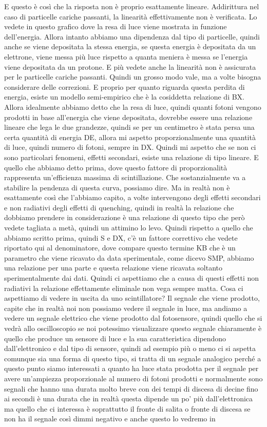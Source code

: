{E questo è così che la risposta non è proprio esattamente lineare. Addirittura nel caso di particelle cariche passanti, la linearità effettivamente non è verificata. Lo vedete in questo grafico dove la resa di luce viene mostrata in funzione dell'energia. Allora intanto abbiamo una dipendenza dal tipo di particelle, quindi anche se viene depositata la stessa energia, se questa energia è depositata da un elettrone, viene messa più luce rispetto a quanta meniera è messa se l'energia viene depositata da un protone. E più vedete anche la linearità non è assicurata per le particelle cariche passanti. Quindi un grosso modo vale, ma a volte bisogna considerare delle correzioni. E proprio per quanto riguarda questa perdita di energia, esiste un modello semi-empirico che è la cosiddetta relazione di BX. Allora idealmente abbiamo detto che la resa di luce, quindi quanti fotoni vengono prodotti in base all'energia che viene depositata, dovrebbe essere una relazione lineare che lega le due grandezze, quindi se per un centimetro è stata persa una certa quantità di energia DE, allora mi aspetto proporzionalmente una quantità di luce, quindi numero di fotoni, sempre in DX. Quindi mi aspetto che se non ci sono particolari fenomeni, effetti secondari, esiste una relazione di tipo lineare. E quello che abbiamo detto prima, dove questo fattore di proporzionalità rappresenta un'efficienza massima di scintillazione. Che sostanzialmente va a stabilire la pendenza di questa curva, possiamo dire. Ma in realtà non è esattamente così che l'abbiamo capito, a volte intervengono degli effetti secondari e non radiativi degli effetti di quenching, quindi in realtà la relazione che dobbiamo prendere in considerazione è una relazione di questo tipo che però vedete tagliata a metà, quindi un attimino lo levo. Quindi rispetto a quello che abbiamo scritto prima, quindi S e DX, c'è un fattore correttivo che vedete riportato qui al denominatore, dove compare questo termine KB che è un parametro che viene ricavato da data sperimentale, come dicevo SMP, abbiamo una relazione per una parte e questa relazione viene ricavata soltanto sperimentalmente dai dati. Quindi ci aspettiamo che a causa di questi effetti non radiativi la relazione effettamente eliminale non vega sempre matta. Cosa ci aspettiamo di vedere in uscita da uno scintillatore? Il segnale che viene prodotto, capite che in realtà noi non possiamo vedere il segnale in luce, ma andiamo a vedere un segnale elettrico che viene prodotto dal fotosensore, quindi quello che si vedrà allo oscilloscopio se noi potessimo visualizzare questo segnale chiaramente è quello che produce un sensore di luce e la sua caratteristica dipendono dall'elettronico e dal tipo di sensore, quindi ad esempio più o meno ci si aspetta comunque sia una forma di questo tipo, si tratta di un segnale analogico perché a questo punto siamo interessati a quanto ha luce stata prodotta per il segnale per avere un'ampiezza proporzionale al numero di fotoni prodotti e normalmente sono segnali che hanno una durata molto breve con dei tempi di discesa di decine fino ai secondi è una durata che in realtà questa dipende un po' più dall'elettronica ma quello che ci interessa è soprattutto il fronte di salita o fronte di discesa se non ha il segnale così dimmi negativo e anche questo lo vedremo in }
